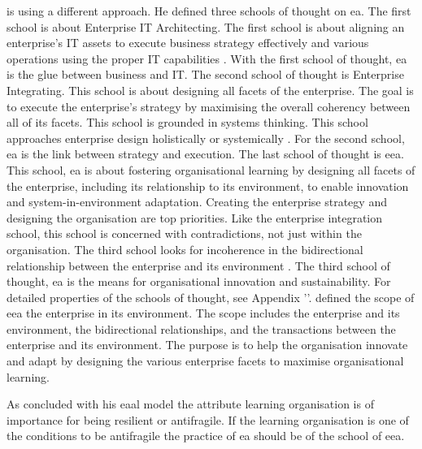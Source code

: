 \textcite{Lapalme2012} is using a different approach. He defined three schools of thought on \acrshort{ea}. The first school is about Enterprise IT Architecting. The first school is about aligning an enterprise's IT assets to execute business strategy effectively and various operations using the proper IT capabilities  \parencite[p.~38]{Lapalme2012}. With the first school of thought, \acrshort{ea} is the glue between business and IT. The second school of thought is Enterprise Integrating. This school is about designing all facets of the enterprise. The goal is to execute the enterprise's strategy by maximising the overall coherency between all of its facets. This school is grounded in systems thinking. This school approaches enterprise design holistically or systemically \parencite[p.~40]{Lapalme2012}. For the second school, \acrshort{ea} is the link between strategy and execution. The last school of thought is \acrfull{eea}. This school, \acrshort{ea} is about fostering organisational learning by designing all facets of the enterprise, including its relationship to its environment, to enable innovation and system-in-environment adaptation. Creating the enterprise strategy and designing the organisation are top priorities. Like the enterprise integration school, this school is concerned with contradictions, not just within the organisation. The third school looks for incoherence in the bidirectional relationship between the enterprise and its environment \parencite[p.~40--41]{Lapalme2012}. The third school of thought, \acrshort{ea} is the means for organisational innovation and sustainability. For detailed properties of the schools of thought, see Appendix ''. \textcite{Lapalme2012} defined the scope of \acrshort{eea} the enterprise in its environment. The scope includes the enterprise and its environment,  the bidirectional relationships, and the transactions between the enterprise and its environment. The purpose is to help the organisation innovate and adapt by designing the various enterprise facets to maximise organisational learning. 

As \textcite{Botjes2020} concluded with his \acrshort{eaal} model the attribute learning organisation is of importance for being \gls{resilient} or \gls{antifragile}. If the learning organisation is one of the conditions to be \gls{antifragile} the practice of \acrshort{ea} should be of the school of \acrshort{eea}.